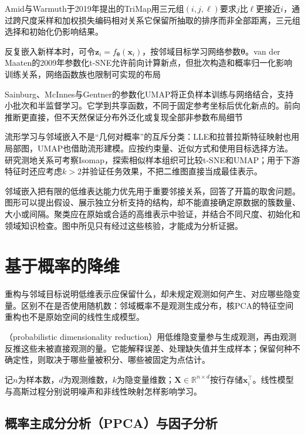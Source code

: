 Amid与Warmuth于2019年提出的TriMap用三元组$(i,j,\ell)$要求$j$比$\ell$更接近$i$，通过跨尺度采样和加权损失编码相对关系它保留所抽取的排序而非全部距离，三元组选择和初始化仍影响结果。

反复嵌入新样本时，可令$\bm{z}_i=f_{\bm{\theta}}(\bm{x}_i)$，按邻域目标学习网络参数$\bm{\theta}$。van der Maaten的2009年参数化t-SNE允许前向计算新点，但批次构造和概率归一化影响训练关系，网络函数族也限制可实现的布局

Sainburg、McInnes与Gentner的参数化UMAP将正负样本训练与网络结合，支持小批次和半监督学习。它学到共享函数，不同于固定参考坐标后优化新点的。前向推断更直接，但不天然保证分布外泛化或复现全部非参数布局细节

流形学习与邻域嵌入不是“几何对概率”的互斥分类：LLE和拉普拉斯特征映射也用局部图，UMAP也借助流形建模。应按约束量、近似方式和使用目标选择方法。研究测地关系可考察Isomap，探索相似样本组织可比较t-SNE和UMAP；用于下游特征时还应考虑$k>2$并验证任务效果，不把二维图直接当成最佳表示。

邻域嵌入把有限的低维表达能力优先用于重要邻接关系，回答了开篇的取舍问题。图形可以提出假设、展示独立分析支持的结构，却不能直接确定原数据的簇数量、大小或间隔。聚类应在原始或合适的高维表示中验证，并结合不同尺度、初始化和领域知识检查。图中所见只有经过这些核验，才能成为分析证据。

\section{基于概率的降维}
\label{sec:dim-probabilistic}

重构与邻域目标说明低维表示应保留什么，却未规定观测如何产生、对应哪些隐变量。区别不在是否使用随机数：邻域概率不是观测生成分布，核PCA的特征空间重构也不是原始空间的线性生成模型。

（probabilistic dimensionality reduction）用低维隐变量参与生成观测，再由观测反推这些未被直接观测的量。它能解释误差、处理缺失值并生成样本；保留何种不确定性，则取决于哪些量被积分、哪些被固定为点估计。

记$n$为样本数，$d$为观测维数，$k$为隐变量维数；$\bm{X}\in\mathbb{R}^{n\times d}$按行存储$\bm{x}_i^\top$。线性模型与高斯过程分别说明噪声和非线性映射怎样影响学习。

\subsection{概率主成分分析（PPCA）与因子分析}
\label{sec:dim-ppca}

